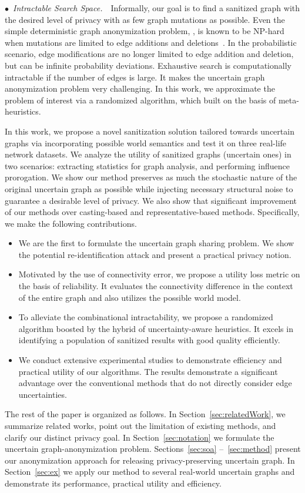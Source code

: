 $\bullet$~\textup{\emph{Intractable Search Space.}}~~Informally, our goal is to find a sanitized graph with the desired level of privacy with as few graph mutations as possible. 
Even the simple deterministic graph anonymization problem, {\ie}, is known to be NP-hard when mutations are limited to edge additions and deletions~\cite{Hartung_Theory_2015}. 
In the probabilistic scenario, edge modifications are no longer limited to edge addition and deletion, but can be infinite probability deviations. 
Exhaustive search is computationally intractable if the number of edges is large. 
It makes the uncertain graph anonymization problem very challenging. 
In this work, we approximate the problem of interest via a randomized algorithm, which built on the basis of meta-heuristics. 

In this work, we propose a novel sanitization solution tailored towards uncertain graphs via incorporating possible world semantics and test it on three real-life network datasets. We analyze the utility of sanitized graphs (uncertain ones) in two scenarios: extracting statistics for graph analysis, and performing influence prorogation. We show our method preserves as much the stochastic nature of the original uncertain graph as possible while injecting necessary structural noise to guarantee a desirable level of privacy. We also show that significant improvement of our methods over casting-based and representative-based methods. 
Specifically, we make the following contributions.
\begin{itemize}
\item We are the first to formulate the uncertain graph sharing problem. 
 We show the potential re-identification attack and present a practical privacy notion. 
\item Motivated by the use of connectivity error, we propose a utility loss metric on the basis of reliability. It evaluates the connectivity difference in the context of the entire graph and also utilizes the possible world model. 
\item To alleviate the combinational intractability, we propose a randomized algorithm boosted by the hybrid of uncertainty-aware heuristics. It excels in identifying a population of sanitized results with good quality efficiently.
\item We conduct extensive experimental studies to demonstrate efficiency and practical utility of our algorithms. The results demonstrate a significant advantage over the conventional methods that do not directly consider edge uncertainties.
\end{itemize}

The rest of the paper is organized as follows. In Section~\ref{sec:relatedWork}, we summarize related works, point out the limitation of existing methods, and clarify our distinct privacy goal. In Section~\ref{sec:notation} we formulate the uncertain graph-anonymization problem. Sections~\ref{sec:soa} –~\ref{sec:method} present our anonymization approach for releasing privacy-preserving uncertain graph.  In Section~\ref{sec:ex} we apply our method to several real-world uncertain graphs and demonstrate its performance, practical utility and efficiency. 